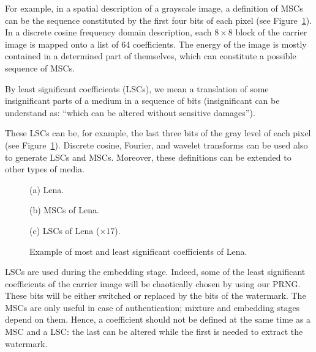 For example, in a spatial description of a grayscale image, a definition of MSCs can be the sequence constituted by the first four bits of each pixel (see Figure~\ref{fig:MSCLC}). In a discrete cosine frequency domain description, each $8\times 8$ block of the carrier image is mapped onto a list of 64 coefficients. The energy of the image is mostly contained in a determined part of themselves, which can constitute a possible sequence of MSCs.

\begin{Definition}
\label{definitionLSC}
By least significant coefficients (LSCs), we mean a translation of some insignificant parts of a medium in a sequence of bits (insignificant can be understand as: ``which can be altered without sensitive damages'').
\end{Definition}

These LSCs can be, for example, the last three bits of the gray level of each pixel (see Figure~\ref{fig:MSCLC}). Discrete cosine, Fourier, and wavelet transforms can be used also to generate LSCs and MSCs. Moreover, these definitions can be extended to other types of media.




\begin{figure}[htb]

\begin{minipage}[b]{1.0\linewidth}
  \centering
 \centerline{}
  \centerline{(a) Lena.}
\end{minipage}

\begin{minipage}[b]{.48\linewidth}
  \centering
 \centerline{}
  \centerline{(b) MSCs of Lena.}
\end{minipage}
\hfill
\begin{minipage}[b]{0.48\linewidth}
  \centering
 \centerline{}
  \centerline{(c) LSCs of Lena ($\times 17$).}
\end{minipage}
%
\caption{Example of most and least significant coefficients of Lena.}
\label{fig:MSCLC}
%
\end{figure}


LSCs are used during the embedding stage. Indeed, some of the least significant coefficients of the carrier image will be chaotically chosen by using our PRNG. These bits will be either switched or replaced by the bits of the watermark. The MSCs are only useful in case of authentication; mixture and embedding stages depend on them. Hence, a coefficient should not be defined at the same time as a MSC and a LSC: the last can be altered while the first is needed to extract the watermark.

